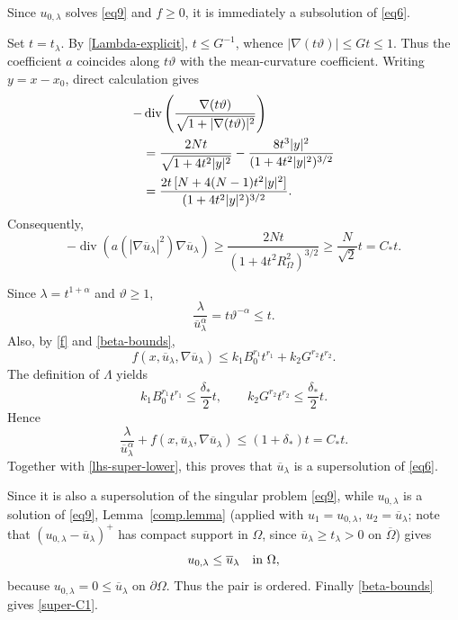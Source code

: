 \documentclass[11pt,leqno]{amsart}
\makeatletter
\renewenvironment{proof}[1][\proofname]{%
  \par
  \pushQED{\qed}%
  \normalfont
  \topsep6\p@\@plus6\p@\relax
  \trivlist
  \item[\hskip\labelsep\itshape #1\@addpunct{.}]%
  \hspace{0.5em}\ignorespaces
}{%
  \popQED
  \endtrivlist\@endpefalse
}
\makeatother
\begin{document}
\begin{proof}
Since $u_{0,\lambda}$ solves \eqref{eq9} and $f\ge0$, it is immediately a
subsolution of \eqref{eq6}.

Set $t=t_\lambda$. By \eqref{Lambda-explicit}, $t\le G^{-1}$, whence
$|\nabla(t\vartheta)|\le Gt\le1$. Thus the coefficient $a$ coincides along
$t\vartheta$ with the mean-curvature coefficient. Writing $y=x-x_0$, direct
calculation gives
\begin{align}
-&\operatorname{div}\left(\frac{\nabla(t\vartheta)}
{\sqrt{1+|\nabla(t\vartheta)|^2}}\right)\notag\\
&=\frac{2Nt}{\sqrt{1+4t^2|y|^2}}
-\frac{8t^3|y|^2}{(1+4t^2|y|^2)^{3/2}}\notag\\
&=\frac{2t\,[N+4(N-1)t^2|y|^2]}
{(1+4t^2|y|^2)^{3/2}}.\label{exact-super-op}
\end{align}
Consequently,
\begin{equation}\label{lhs-super-lower}
-\operatorname{div}\left(a(|\nabla\overline u_\lambda|^2)
\nabla\overline u_\lambda\right)
\ge\frac{2Nt}{(1+4t^2R_\Omega^2)^{3/2}}
\ge\frac{N}{\sqrt2}t=C_*t.
\end{equation}

Since $\lambda=t^{1+\alpha}$ and $\vartheta\ge1$,
\begin{equation}\label{sing-super}
\frac{\lambda}{\overline u_\lambda^\alpha}
=t\vartheta^{-\alpha}\le t.
\end{equation}
Also, by \eqref{f} and \eqref{beta-bounds},
\begin{equation}\label{f-super}
f(x,\overline u_\lambda,\nabla\overline u_\lambda)
\le k_1B_0^{r_1}t^{r_1}+k_2G^{r_2}t^{r_2}.
\end{equation}
The definition of $\Lambda$ yields
\[
k_1B_0^{r_1}t^{r_1}\le\frac{\delta_*}{2}t,
\qquad
k_2G^{r_2}t^{r_2}\le\frac{\delta_*}{2}t.
\]
Hence
\[
\frac{\lambda}{\overline u_\lambda^\alpha}
+f(x,\overline u_\lambda,\nabla\overline u_\lambda)
\le(1+\delta_*)t=C_*t.
\]
Together with \eqref{lhs-super-lower}, this proves that
$\overline u_\lambda$ is a supersolution of \eqref{eq6}.

Since it is also a supersolution of the singular problem \eqref{eq9}, while
$u_{0,\lambda}$ is a solution of \eqref{eq9}, Lemma~\ref{comp.lemma}
(applied with $u_1=u_{0,\lambda}$, $u_2=\overline u_\lambda$; note that
$(u_{0,\lambda}-\overline u_\lambda)^+$ has compact support in $\Omega$,
since $\overline u_\lambda\ge t_\lambda>0$ on $\overline\Omega$) gives
\[
u_{0,\lambda}\le\overline u_\lambda\quad\hbox{in }\Omega,
\]
because $u_{0,\lambda}=0\le\overline u_\lambda$ on $\partial\Omega$.
Thus the pair is ordered. Finally \eqref{beta-bounds} gives
\eqref{super-C1}.
\end{proof}
\end{document}
